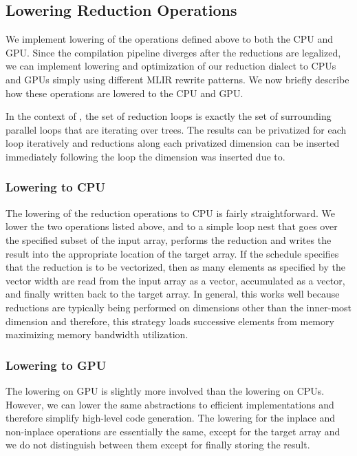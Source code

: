 \subsection{Lowering Reduction Operations}
We implement lowering of the operations defined above to both the CPU and GPU.
Since the compilation pipeline diverges after the reductions are legalized, 
we can implement lowering and optimization of our reduction dialect to CPUs and
GPUs simply using different MLIR rewrite patterns. We now briefly describe 
how these operations are lowered to the CPU and GPU. 

In the context of \Treebeard{}, the set of reduction loops is exactly the set 
of surrounding parallel loops that are iterating over trees. The 
results can be privatized for each loop iteratively 
and reductions along each privatized dimension can be inserted  
immediately following the loop the dimension was inserted due to.

\subsubsection{Lowering to CPU}
The lowering of the reduction operations to CPU is fairly straightforward. We lower the 
two operations listed above,  and 
 to a simple loop nest that goes over the specified
subset of the input array, performs the reduction and writes 
the result into the appropriate location of the target array. 
If the schedule specifies that the reduction is to be vectorized,
then as many elements as specified by the vector width are read 
from the input array as a vector, accumulated as a vector, and 
finally written back to the target array. In general, this works 
well because reductions are typically being performed on dimensions
other than the inner-most dimension and therefore, this strategy
loads successive elements from memory maximizing memory bandwidth 
utilization. 


\subsubsection{Lowering to GPU}
The lowering on GPU is slightly more involved than the lowering on CPUs.
However, we can lower the same abstractions to efficient implementations
and therefore simplify high-level code generation. The lowering for 
the inplace and non-inplace operations are essentially the same, except 
for the target array and we do not distinguish between them except 
for finally storing the result. 

